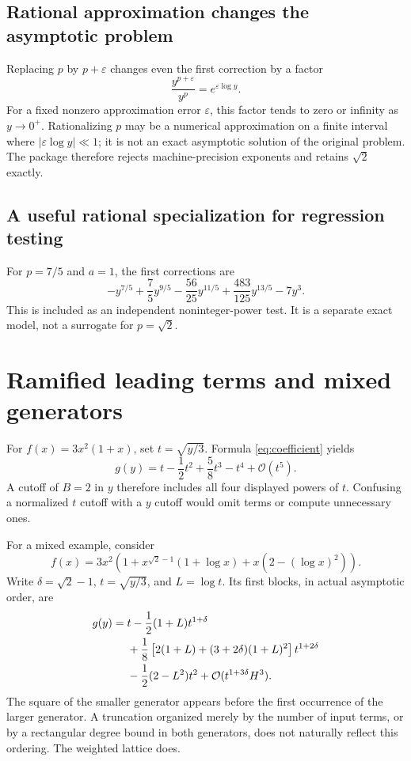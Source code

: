 \documentclass[11pt,a4paper]{article}
\numberwithin{equation}{section}
\theoremstyle{definition}\newtheorem{definition}[theorem]{Definition}
\theoremstyle{remark}\newtheorem{remark}[theorem]{Remark}
\newcommand{\OO}{\mathcal O}\newcommand{\Id}{\mathrm{id}}
\begin{document}
\subsection{Rational approximation changes the asymptotic problem}
Replacing $p$ by $p+\varepsilon$ changes even the first correction by a factor
\[
\frac{y^{p+\varepsilon}}{y^p}=e^{\varepsilon\log y}.
\]
For a fixed nonzero approximation error $\varepsilon$, this factor tends to zero or infinity as $y\to0^+$. Rationalizing $p$ may be a numerical approximation on a finite interval where $|\varepsilon\log y|\ll1$; it is not an exact asymptotic solution of the original problem. The package therefore rejects machine-precision exponents and retains $\sqrt2$ exactly.

\subsection{A useful rational specialization for regression testing}
For $p=7/5$ and $a=1$, the first corrections are
\[
-y^{7/5}+\frac75y^{9/5}-\frac{56}{25}y^{11/5}
+\frac{483}{125}y^{13/5}-7y^3.
\]
This is included as an independent noninteger-power test. It is a separate exact model, not a surrogate for $p=\sqrt2$.

\section{Ramified leading terms and mixed generators}
\label{sec:mixed}
For $f(x)=3x^2(1+x)$, set $t=\sqrt{y/3}$. Formula \eqref{eq:coefficient} yields
\begin{equation}
g(y)=t-\frac12t^2+\frac58t^3-t^4+\OO(t^5).
\end{equation}
A cutoff of $B=2$ in $y$ therefore includes all four displayed powers of $t$. Confusing a normalized $t$ cutoff with a $y$ cutoff would omit terms or compute unnecessary ones.

For a mixed example, consider
\begin{equation}
f(x)=3x^2\left(1+x^{\sqrt2-1}(1+\log x)
+x(2-(\log x)^2)\right).
\end{equation}
Write $\delta=\sqrt2-1$, $t=\sqrt{y/3}$, and $L=\log t$. Its first blocks, in actual asymptotic order, are
\begin{align}
g(y)={}&t-\frac12(1+L)t^{1+\delta}\\
&+\frac18\left[2(1+L)+(3+2\delta)(1+L)^2\right]t^{1+2\delta}\notag\\
&-\frac12(2-L^2)t^2+\OO(t^{1+3\delta}H^3).\notag
\end{align}
The square of the smaller generator appears before the first occurrence of the larger generator. A truncation organized merely by the number of input terms, or by a rectangular degree bound in both generators, does not naturally reflect this ordering. The weighted lattice does.
\end{document}
